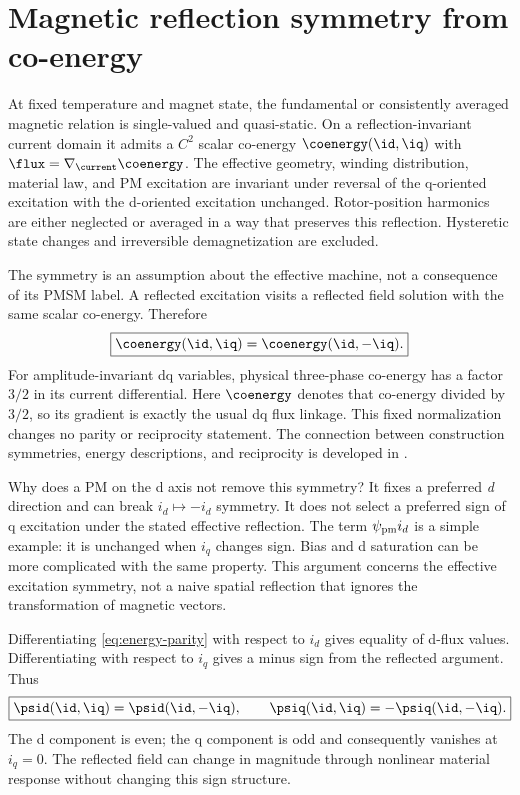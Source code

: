 \section{Magnetic reflection symmetry from co-energy}
\label{sec:symmetry}
\begin{assumption}
At fixed temperature and magnet state, the fundamental or consistently
averaged magnetic relation is single-valued and quasi-static. On a
reflection-invariant current domain it admits a $C^2$ scalar co-energy
$\coenergy(\id,\iq)$ with $\flux=\nabla_{\current}\coenergy$.
The effective geometry, winding distribution, material law, and PM excitation
are invariant under reversal of the q-oriented excitation with the d-oriented
excitation unchanged. Rotor-position harmonics are either neglected or
averaged in a way that preserves this reflection. Hysteretic state changes
and irreversible demagnetization are excluded.
\end{assumption}
The symmetry is an assumption about the effective machine, not a consequence
of its PMSM label. A reflected excitation visits a reflected field solution
with the same scalar co-energy. Therefore
\begin{equation}
 \boxed{\coenergy(\id,\iq)=\coenergy(\id,-\iq).}\label{eq:energy-parity}
\end{equation}
For amplitude-invariant dq variables, physical three-phase co-energy has a
factor $3/2$ in its current differential. Here $\coenergy$ denotes that co-energy
divided by $3/2$, so its gradient is exactly the usual dq flux linkage.
This fixed normalization changes no parity or reciprocity statement.
The connection between construction symmetries, energy descriptions, and
reciprocity is developed in \cite{jebai2014}.

Why does a PM on the d axis not remove this symmetry? It fixes a preferred
\emph{d} direction and can break $i_d\mapsto-i_d$ symmetry. It does not select
a preferred sign of q excitation under the stated effective reflection.
The term $\psi_{\rm pm}i_d$ is a simple example: it is unchanged when $i_q$
changes sign. Bias and d saturation can be more complicated with the same
property. This argument concerns the effective excitation symmetry, not a
naive spatial reflection that ignores the transformation of magnetic vectors.

Differentiating \cref{eq:energy-parity} with respect to $i_d$ gives equality
of d-flux values. Differentiating with respect to $i_q$ gives a minus sign
from the reflected argument. Thus
\begin{equation}
 \boxed{\psid(\id,\iq)=\psid(\id,-\iq),\qquad
 \psiq(\id,\iq)=-\psiq(\id,-\iq).}\label{eq:flux-parity}
\end{equation}
The d component is even; the q component is odd and consequently vanishes at
$i_q=0$. The reflected field can change in magnitude through nonlinear
material response without changing this sign structure.


